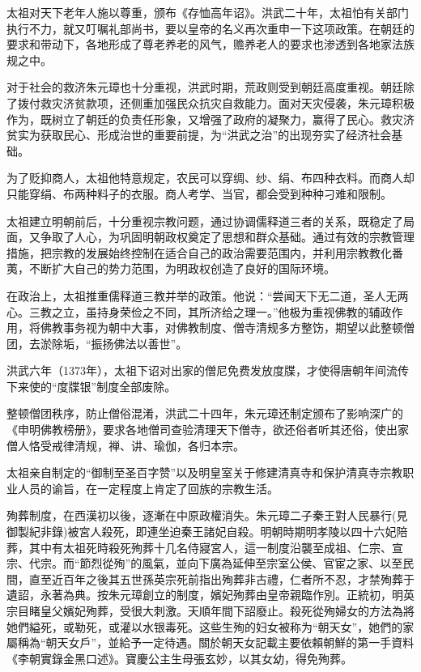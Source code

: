 太祖对天下老年人施以尊重，颁布《存恤高年诏》。洪武二十年，太祖怕有关部门执行不力，就又叮嘱礼部尚书，要以皇帝的名义再次重申一下这项政策。在朝廷的要求和带动下，各地形成了尊老养老的风气，赡养老人的要求也渗透到各地家法族规之中。

对于社会的救济朱元璋也十分重视，洪武时期，荒政则受到朝廷高度重视。朝廷除了拨付救灾济贫款项，还侧重加强民众抗灾自救能力。面对天灾侵袭，朱元璋积极作为，既树立了朝廷的负责任形象，又增强了政府的凝聚力，赢得了民心。救灾济贫实为获取民心、形成治世的重要前提，为“洪武之治”的出现夯实了经济社会基础。

为了贬抑商人，太祖他特意规定，农民可以穿绸、纱、绢、布四种衣料。而商人却只能穿绢、布两种料子的衣服。商人考学、当官，都会受到种种刁难和限制。

太祖建立明朝前后，十分重视宗教问题，通过协调儒释道三者的关系，既稳定了局面，又争取了人心，为巩固明朝政权奠定了思想和群众基础。通过有效的宗教管理措施，把宗教的发展始终控制在适合自己的政治需要范围内，并利用宗教教化番荑，不断扩大自己的势力范围，为明政权创造了良好的国际环境。

在政治上，太祖推重儒释道三教并举的政策。他说：“尝闻天下无二道，圣人无两心。三教之立，虽持身荣俭之不同，其所济给之理一。”他极为重视佛教的辅政作用，将佛教事务视为朝中大事，对佛教制度、僧寺清规多方整饬，期望以此整顿僧团，去淤除垢，“振扬佛法以善世”。

洪武六年（1373年），太祖下诏对出家的僧尼免费发放度牒，才使得唐朝年间流传下来使的“度牒银”制度全部废除。

整顿僧团秩序，防止僧俗混淆，洪武二十四年，朱元璋还制定颁布了影响深广的《申明佛教榜册》，要求各地僧司查验清理天下僧寺，欲还俗者听其还俗，使出家僧人恪受戒律清规，禅、讲、瑜伽，各归本宗。

太祖亲自制定的“御制至圣百字赞”以及明皇室关于修建清真寺和保护清真寺宗教职业人员的谕旨，在一定程度上肯定了回族的宗教生活。

殉葬制度，在西漢初以後，逐漸在中原政權消失。朱元璋二子秦王對人民暴行(見御製紀非錄)被宮人殺死，即連坐迫秦王諸妃自殺。明朝時期明孝陵以四十六妃陪葬，其中有太祖死時殺死殉葬十几名侍寢宮人，這一制度沿襲至成祖、仁宗、宣宗、代宗。而“節烈從殉”的風氣，並向下廣為延伸至宗室公侯、官宦之家、以至民間，直至近百年之後其五世孫英宗死前指出殉葬非古禮，仁者所不忍，才禁殉葬于遺詔，永著為典。按朱元璋創立的制度，嬪妃殉葬由皇帝親臨作別。正統初，明英宗目睹皇父嬪妃殉葬，受很大刺激。天順年間下詔廢止。殺死從殉婦女的方法為將她們縊死，或勒死，或灌以水银毒死。这些生殉的妇女被称为“朝天女”，她們的家屬稱為“朝天女戶”，並給予一定待遇。關於朝天女記載主要依賴朝鮮的第一手資料《李朝實錄金黑口述》。寶慶公主生母張玄妙，以其女幼，得免殉葬。


